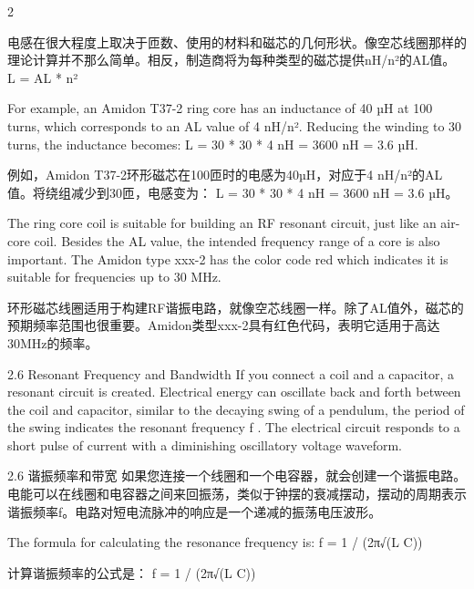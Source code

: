 \documentclass{ctexbook}
\begin{document}
\begin{paracol}{2}
\switchcolumn

电感在很大程度上取决于匝数、使用的材料和磁芯的几何形状。像空芯线圈那样的理论计算并不那么简单。相反，制造商将为每种类型的磁芯提供nH/n²的AL值。
L = AL * n²

\switchcolumn*

For example, an Amidon T37-2 ring core has an inductance of 40 µH at 100 turns, which 
corresponds to an AL value of 4 nH/n². Reducing the winding to 30 turns, the inductance 
becomes: 
L = 30 * 30 * 4 nH = 3600 nH = 3.6 µH. 

\switchcolumn

例如，Amidon T37-2环形磁芯在100匝时的电感为40µH，对应于4 nH/n²的AL值。将绕组减少到30匝，电感变为：
L = 30 * 30 * 4 nH = 3600 nH = 3.6 µH。

\switchcolumn*

The ring core coil is suitable for building an RF resonant circuit, just like an air-core coil. 
Besides the AL value, the intended frequency range of a core is also important. The Amidon 
type xxx-2 has the color code red which indicates it is suitable for frequencies up to 30 MHz.

\switchcolumn

环形磁芯线圈适用于构建RF谐振电路，就像空芯线圈一样。除了AL值外，磁芯的预期频率范围也很重要。Amidon类型xxx-2具有红色代码，表明它适用于高达30MHz的频率。

\switchcolumn*

2.6 Resonant Frequency and Bandwidth 
If you connect a coil and a capacitor, a resonant circuit is created. Electrical energy can 
oscillate back and forth between the coil and capacitor, similar to the decaying swing of a 
pendulum, the period of the swing indicates the resonant frequency f . The electrical circuit 
responds to a short pulse of current with a diminishing oscillatory voltage waveform. 

\switchcolumn

2.6 谐振频率和带宽
如果您连接一个线圈和一个电容器，就会创建一个谐振电路。电能可以在线圈和电容器之间来回振荡，类似于钟摆的衰减摆动，摆动的周期表示谐振频率f。电路对短电流脉冲的响应是一个递减的振荡电压波形。

\switchcolumn*

The formula for calculating the resonance frequency is: 
f = 1 / (2π√(L C)) 

\switchcolumn

计算谐振频率的公式是：
f = 1 / (2π√(L C))

\switchcolumn*


\end{paracol}
\end{document}
